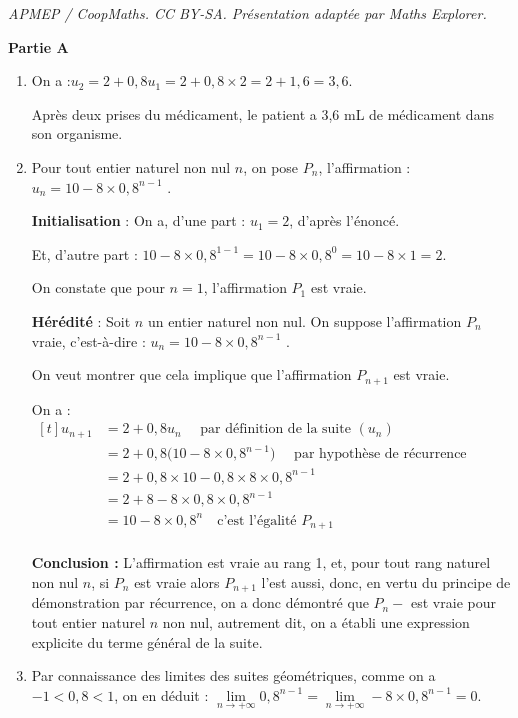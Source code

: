 \documentclass[10pt]{article}
\begin{document}
\noindent\textit{APMEP / CoopMaths. CC BY-SA. Présentation adaptée par Maths Explorer.}\par\medskip
\medskip

\textbf{Partie A}

\begin{enumerate}
	\item On a :\quad $u_2 = 2 + 0,8u_1 = 2 + 0,8 \times 2 = 2 + 1,6 = 3,6$.

Après deux prises du médicament, le patient a 3,6 mL de médicament dans son organisme.

	\item Pour tout entier naturel non nul $n$, on pose $P_n$, l'affirmation : \og $u_n = 10 - 8\times 0,8^{n-1}$ \fg{}.

\textbf{Initialisation }: On a, d'une part : $u_1 = 2$, d'après l'énoncé.

Et, d'autre part : $10 - 8 \times 0,8^{1 - 1} = 10 - 8 \times 0,8^0 = 10 - 8 \times 1 = 2$.

On constate que pour $n = 1$, l'affirmation $P_1$ est vraie.

\textbf{Hérédité } : Soit $n$ un entier naturel non nul. On suppose l'affirmation $P_n $ vraie, c'est-à-dire : \quad \og $u_n = 10 - 8\times 0,8^{n-1}$ \fg{}.

On veut montrer que cela implique que l'affirmation $ P_{n+1} $ est vraie.

	On a : \quad $ \begin{aligned}[t] u_{n+1}
		&= 2 + 0,8u_n \quad \text{	par définition de la suite }(u_n) \\
		&= 2 + 0,8 \Big(10 - 8\times 0,8^{n-1}\Big) \quad \text{	par hypothèse de récurrence}\\
		&= 2 + 0,8 \times 10 - 0,8 \times 8\times 0,8^{n-1}\\
		&= 2 + 8 - 8\times 0,8 \times 0,8^{n-1}\\
		&= 10 - 8 \times 0,8^{n} \quad \text{c'est l'égalité } P_{n+1}\\
	\end{aligned}$

\textbf{Conclusion :} L'affirmation est vraie au rang 1, et, pour tout rang naturel non nul $n$, \: si $P_n$ est vraie alors $P_{n+1}$ l'est aussi, donc, en vertu du principe de démonstration par récurrence, on a donc démontré que  $P_n-$ est vraie pour tout entier naturel $n$ non nul, autrement dit, on a établi une expression explicite du terme général de la suite.

	\item Par connaissance des limites des suites géométriques, comme on a $-1 < 0,8 < 1$, on en déduit : \quad $\lim\limits_{n \to +\infty} 0,8^{n-1} =  \lim\limits_{n \to +\infty} - 8\times 0,8^{n-1} = 0$.


\end{enumerate}
\end{document}
